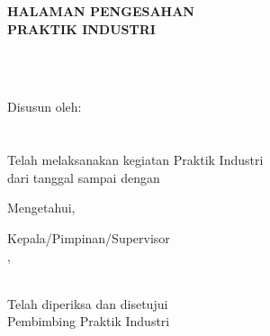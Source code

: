 \newpage

\begin{center}
    \begin{doublespace}
        \textbf{\large \MakeUppercase{Halaman Pengesahan \\ Praktik Industri}}
    \end{doublespace}
\end{center}

\begin{center}
    \textbf{\normalsize \MakeUppercase {\judulid}} \\
    \textbf{\normalsize \MakeUppercase {\tempat}} \\ [5cm]
\end{center}

\begin{center}
    Disusun oleh:\\
    \textbf{\underline{\penulis}}\\
    \textbf{\nim}\\[4cm]

    Telah melaksanakan kegiatan Praktik Industri \\
    dari tanggal \textbf{\tglMulai} sampai dengan \textbf{\tglSelesai} \\ [2cm]
\end{center}

\begin{center}
    Mengetahui, \\[1cm]
\end{center}
\begin{minipage}{0.45\textwidth}
    Kepala/Pimpinan/Supervisor\\
    \tempat,\\[2cm]
    \underline{\pimpinanPerusahaan}\\
    \jabatanPimpinan
\end{minipage}%
\hfill
 \begin{minipage}{0.35\textwidth}
    Telah diperiksa dan disetujui \\
    Pembimbing Praktik Industri\\[2cm]
    \underline{\pembimbingPerusahaan}\\
    \jabatanPembimbing
\end{minipage}